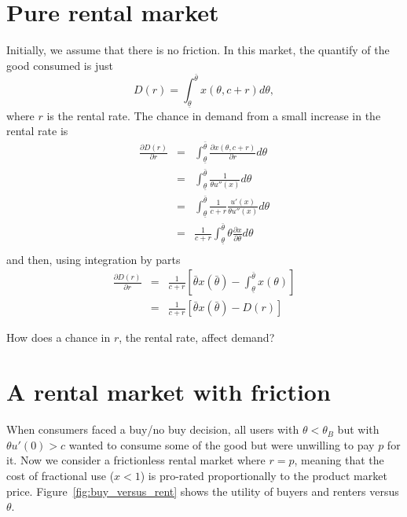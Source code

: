 \documentclass[11pt]{article}
\begin{document}
\section{Pure rental market} 
Initially, we assume that there is no friction. 
In this market, the quantify of the good consumed is just 
\begin{equation}
D(r) = \int_{\underline{\theta}}^{\bar{\theta}} x(\theta, c + r) d\theta,  
\end{equation} 
where $r$ is the rental rate. 
The chance in demand from a small increase in the rental rate is 
\begin{eqnarray*}
\frac{\partial D(r)}{\partial r} &=& \int_{\underline{\theta}}^{\bar{\theta}} \frac{\partial x(\theta, c + r)}{\partial r} d\theta  \\
                                 &=& \int_{\underline{\theta}}^{\bar{\theta}} \frac{1}{\theta u''(x)} d\theta  \\
                                 &=& \int_{\underline{\theta}}^{\bar{\theta}} \frac{1}{c+r}\frac{u'(x)}{\theta u''(x)} d\theta  \\
                                 &=& \frac{1}{c+r} \int_{\underline{\theta}}^{\bar{\theta}} \theta \frac{\partial x}{\partial \theta} d\theta  \\

\end{eqnarray*} 
and then, using integration by parts 
\begin{eqnarray}
\frac{\partial D(r)}{\partial r} &=& \frac{1}{c+r}\left[\bar{\theta}x(\bar{\theta}) - \int_{\underline{\theta}}^{\bar{\theta}} x(\theta) \right] \\ 
                                 &=& \frac{1}{c+r}\left[\bar{\theta}x(\bar{\theta}) - D(r) \right]
\end{eqnarray} 

How does a chance in $r$, the rental rate, affect demand? 


\section{A rental market with friction} 
When consumers faced a buy/no buy decision, all users with $\theta < \theta_B$ but with $\theta u'(0) > c$ wanted to consume some of the good but were unwilling to pay $p$ for it. 
Now we consider a frictionless rental market where $r = p$, meaning that the cost of fractional use ($x < 1$) is pro-rated proportionally to the product market price. 
Figure~\ref{fig:buy_versus_rent} shows the utility of buyers and renters versus $\theta$. 
\end{document}

